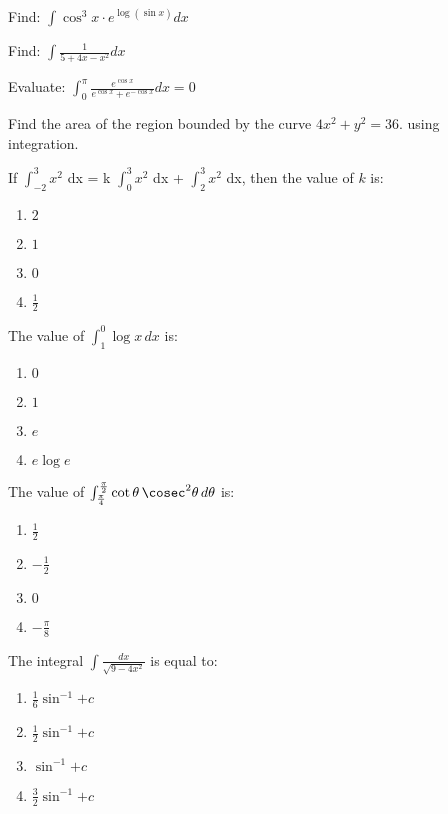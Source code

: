 \item Find: $\int \cos^3  x \cdot e^{\log(\sin x)}dx$

\item Find: $\int \frac{1}{5+4x-x^2}dx$	

\item Evaluate: $\int_{0}^{\pi}\frac{e^{\cos{x}}}{e^{\cos{x}} + e^{-\cos{x}}}dx = 0$

\item Find the area of the region bounded by the curve $ 4x^2 + y^2 =36$. using integration.
\item If  $\int_{-2}^{3} x^2$ dx = k  $\int_0^3 x^2$ dx +  $\int_2^3 x^2$ dx, then the value of $k$ is:
    \begin{enumerate}[label=(\alph*)]
        \item $2$
        \item $1$
        \item $0$
        \item $\frac{1}{2}$
    \end{enumerate}

    \item The value of $\int_{1}^{0} \log x \, dx$ is:
    \begin{enumerate}[label=(\alph*)]
        \item $0$
        \item $1$
        \item $e$
        \item $e \log e$
    \end{enumerate}

\item The value of  $ \int_{\frac{\pi}{4}}^{\frac{\pi}{2}}\cot \theta \, \cosec^2 \theta \, d\theta $ is:
\begin{enumerate}
\item $\frac{1}{2}$
\item $ -\frac{1}{2} $
\item $ 0 $                                                             
\item $ -\frac{\pi}{8} $                                                
\end{enumerate} 

\item The integral $ \int \frac{dx}{\sqrt{9-4x^2}} $ is equal to:                                                                                           \begin{enumerate}                     
\item $ \frac{1}{6} \sin^{-1} $$ + c $               
\item $ \frac{1}{2} \sin^{-1} $$ + c $               
\item $\sin^{-1} $$ + c $                           
\item $ \frac{3}{2} \sin^{-1} $$ + c $                           
\end{enumerate}

